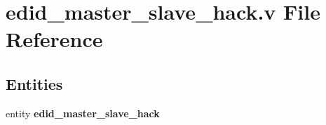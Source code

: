 \section{edid\-\_\-master\-\_\-slave\-\_\-hack.\-v File Reference}
\label{edid__master__slave__hack_8v}
\subsection*{Entities}
\begin{DoxyCompactItemize}
\item 
entity {\bf edid\-\_\-master\-\_\-slave\-\_\-hack}
\end{DoxyCompactItemize}

